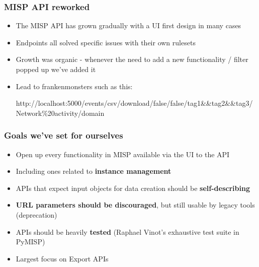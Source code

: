 
\begin{frame}[t,plain]
\titlepage
\end{frame}

\begin{frame}
\frametitle{MISP API reworked}
    \begin{itemize}
        \item The MISP API has grown gradually with a UI first design in many cases
        \item Endpoints all solved specific issues with their own rulesets
	\item Growth was organic - whenever the need to add a new functionality / filter popped up we've added it
	\item Lead to frankenmonsters such as this:
		\begin{adjustbox}{width=\textwidth,height=.5cm,keepaspectratio}
		    http://localhost:5000/events/csv/download/false/false/tag1\&\&tag2\&\&\!tag3/Network\%20activity/domain
		\end{adjustbox}
    \end{itemize}
\end{frame}

\begin{frame}
\frametitle{Goals we've set for ourselves}
    \begin{itemize}
        \item Open up every functionality in MISP available via the UI to the API
	\item Including ones related to {\bf instance management}
	\item APIs that expect input objects for data creation should be {\bf self-describing}
	\item {\bf URL parameters should be discouraged}, but still usable by legacy tools (deprecation)
	\item APIs should be heavily {\bf tested} (Raphael Vinot's exhaustive test suite in PyMISP)
	\item Largest focus on Export APIs
    \end{itemize}
\end{frame}


